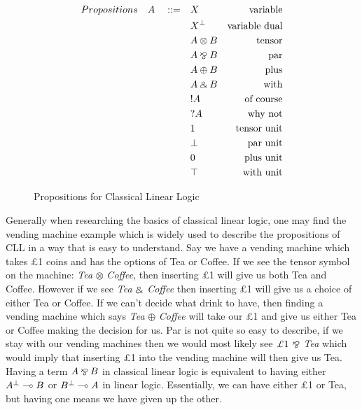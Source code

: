 \begin{figure}[h]
  \begin{align*}
      Propositions \quad A \quad ::= \quad & X &\text{variable} \\
      & \negg{X} &\text{variable dual} \\
      & A \otimes B &\text{tensor} \\
      & A \parr B &\text{par} \\
      & A \oplus B &\text{plus} \\
      & A \with B &\text{with} \\
      & \ofc A &\text{of course} \\
      & \whynot A &\text{why not} \\
      & 1 &\text{tensor unit} \\
      & \bot &\text{par unit} \\
      & 0 &\text{plus unit} \\
      & \top &\text{with unit} \\
  \end{align*}
  \caption{Propositions for Classical Linear Logic}
  \label{fig: p cll}
\end{figure}

\noindent
Generally when researching the basics of classical linear logic, one may find the vending machine example which is 
widely used to describe the propositions of CLL in a way that is easy to understand. Say we have a vending machine 
which takes \pounds 1 coins and has the options of Tea or Coffee. If we see the tensor symbol on the machine: \emph{Tea} 
$\otimes$ \emph{Coffee}, then inserting \pounds 1 will give us both Tea and Coffee. However if we see \emph{Tea} $\mathbin{\binampersand}$ 
\emph{Coffee} then inserting \pounds 1 will give us a choice of either Tea or Coffee. If we can't decide what drink to 
have, then finding a vending machine which says \emph{Tea} $\oplus$ \emph{Coffee} will take our \pounds 1 and give us either 
Tea or Coffee making the decision for us. Par is not quite so easy to describe, if we stay with our vending machines then 
we would most likely see $\pounds 1 \ \parr$ \emph{Tea} which would imply that inserting \pounds 1 into the vending machine 
will then give us Tea. Having a term $A \mathbin{\bindnasrepma} B$ in classical linear logic is equivalent to having either $\negg{A} \multimap B$ 
or $\negg{B} \multimap A$ in linear logic. Essentially, we can have either \pounds 1 or Tea, but having one means we 
have given up the other.  \\

